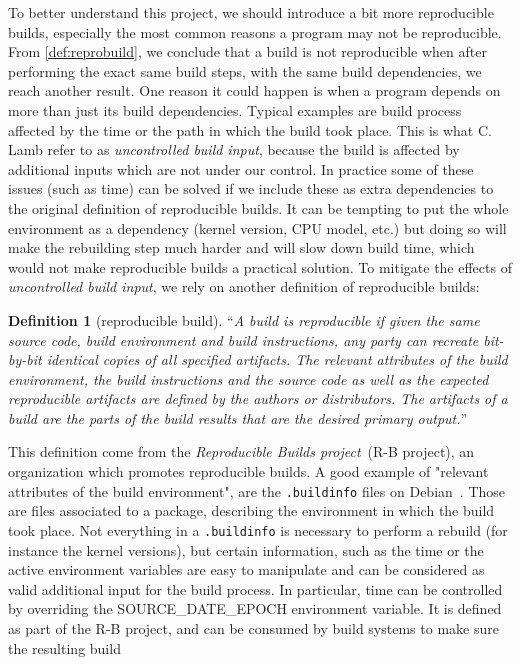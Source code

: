 \documentclass[a4paper,11pt,oneside]{report}
\theoremstyle{definition}
\newtheorem{definition}{Definition}[section]
\newcommand{\rb}{reproducible builds\xspace}
\newcommand{\sde}{SOURCE\_DATE\_EPOCH\xspace}
\begin{document}
To better understand this project, we should introduce a bit more \rb,
especially the most common reasons a program may not be reproducible. From
\autoref{def:reprobuild}, we conclude that a build is not reproducible when
after performing the exact same build steps, with the same build dependencies,
we reach another result. One reason it could happen is when a program depends
on more than just its build dependencies. Typical examples are build process
affected by the time or the path in which the build took place. This is what C.
Lamb refer to as \emph{uncontrolled build input}, because the build is affected
by additional inputs which are not under our control. In practice some of these
issues (such as time) can be solved if we include these as extra dependencies
to the original definition of \rb. It can be tempting to put the whole
environment as a dependency (kernel version, CPU model, etc.) but doing so will
make the rebuilding step much harder and will slow down build time, which would
not make \rb a practical solution. To mitigate the effects of
\emph{uncontrolled build input}, we rely on another definition of \rb:
\begin{definition}[reproducible build]
\label{def:reprobuild2}
``\emph{A build is reproducible if given the same source code, build
    environment and build instructions, any party can recreate bit-by-bit
    identical copies of all specified artifacts.
The relevant attributes of the build environment, the build instructions and
    the source code as well as the expected reproducible artifacts are defined
    by the authors or distributors. The artifacts of a build are the parts of
    the build results that are the desired primary output.}''~\cite{reprobuilds:def}
\end{definition}
This definition come from the \emph{Reproducible Builds project}~(R-B project),
an organization which promotes \rb. A good example of "relevant attributes of
the build environment", are the \verb|.buildinfo| files on
Debian~\cite{debian:buildinfo}. Those are files associated to a package,
describing the environment in which the build took place. Not everything in a
\verb|.buildinfo| is necessary to perform a rebuild (for instance the kernel
versions), but certain information, such as the time or the active environment
variables are easy to manipulate and can be considered as valid additional
input for the build process. In particular, time can be controlled by
overriding the \sde environment variable. It is defined as part of the R-B
project, and can be consumed by build systems to make sure the resulting build
\end{document}
